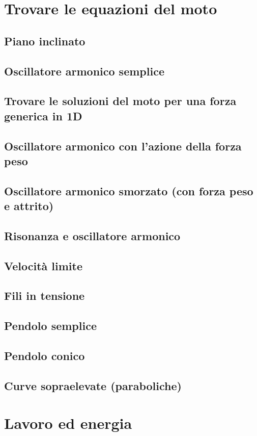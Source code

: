 \documentclass[a4paper]{article}
\begin{document}
\section{Trovare le equazioni del moto}
\subsection{Piano inclinato}
\subsection{Oscillatore armonico semplice}
\subsection{Trovare le soluzioni del moto per una forza generica in 1D}
\subsection{Oscillatore armonico con l'azione della forza peso}
\subsection{Oscillatore armonico smorzato (con forza peso e attrito)}
\subsection{Risonanza e oscillatore armonico}
\subsection{Velocità limite}
\subsection{Fili in tensione}
\subsection{Pendolo semplice}
\subsection{Pendolo conico}
\subsection{Curve sopraelevate (paraboliche)}

\section{Lavoro ed energia}
\end{document}
